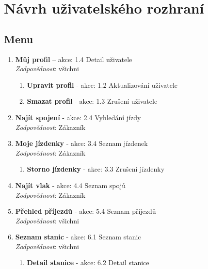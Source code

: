 \documentclass[11pt]{article}
\begin{document}

\newpage

\section{Návrh uživatelského rozhraní}

\subsection{Menu}

\begin{enumerate}
    \item \textbf{Můj profil} – akce: 1.4 Detail uživatele\\
        \textit{Zodpovědnost}: všichni
        \begin{enumerate}
            \item \textbf{Upravit profil} - akce: 1.2 Aktualizování uživatele
            \item \textbf{Smazat profil} - akce: 1.3 Zrušení uživatele
        \end{enumerate}

    \item \textbf{Najít spojení} - akce: 2.4 Vyhledání jízdy\\
        \textit{Zodpovědnost}: Zákazník

    \item \textbf{Moje jízdenky} - akce: 3.4 Seznam jízdenek\\
        \textit{Zodpovědnost}: Zákazník
        \begin{enumerate}
            \item \textbf{Storno jízdenky} - akce: 3.3 Zrušení jízdenky
        \end{enumerate}
    
    \item \textbf{Najít vlak} - akce: 4.4 Seznam spojů\\
        \textit{Zodpovědnost}: Zákazník

    \item \textbf{Přehled příjezdů} - akce: 5.4 Seznam příjezdů\\
        \textit{Zodpovědnost}: všichni

    \item \textbf{Seznam stanic} - akce: 6.1 Seznam stanic\\
        \textit{Zodpovědnost}: všichni
        \begin{enumerate}
            \item \textbf{Detail stanice} - akce: 6.2 Detail stanice
        \end{enumerate}


\end{enumerate}
\end{document}
